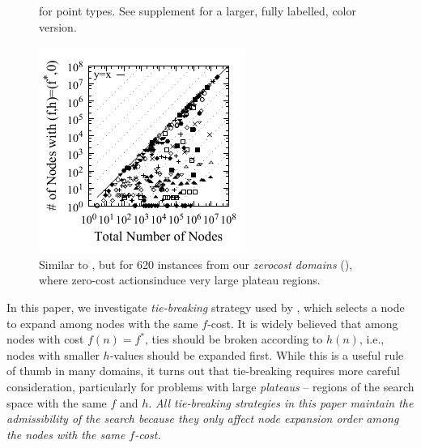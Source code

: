 \begin{figure}[bt]
\begin{minipage}[t]{\minilength}
{  for point types. See supplement for a larger, fully
  labelled, color version.
  }
  \label{plateau}
 \end{minipage} 
 \hfill
 \begin{minipage}[t]{0.23\textwidth}
  \centering
  \includegraphics{tables/aaai16-frontier/zerocost/lmcut_frontier-front-mono.pdf}
  \caption{Similar to , but for 620 instances from our 
  \emph{zerocost domains} (),
  where zero-cost actionsinduce very large plateau regions.
 }
 \label{plateau-zerocost}
 \end{minipage} 
\end{figure}

In this paper, we investigate \emph{tie-breaking} strategy used by
\astar, which selects a node to expand among nodes with the same
$f$-cost.  
It is widely believed that among nodes with
cost $f(n) = f^*$, ties should be broken according to $h(n)$, i.e.,
nodes with smaller $h$-values should be expanded first.  While this is a
useful rule of thumb in many domains, it turns out that tie-breaking
requires more careful consideration, particularly for problems with
large \emph{plateaus} -- regions of the search space with the same $f$ and $h$.
\emph{All tie-breaking strategies in this paper
maintain the admissibility of the search because they only affect node expansion
order among the nodes with the same $f$-cost.}

